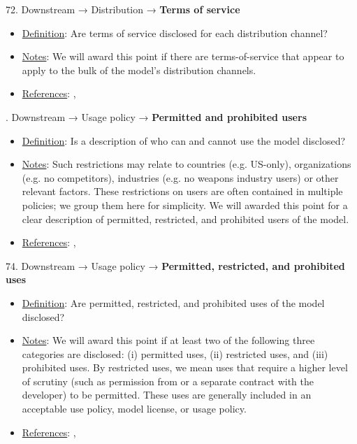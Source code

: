 72. Downstream → Distribution → \textbf{Terms of service}
\vspace{-\parskip}
\begin{itemize}
\item
\underline{Definition}: Are terms of service disclosed for each distribution channel?
\item
\underline{Notes}: We will award this point if there are terms-of-service that appear to apply to the bulk of the model’s distribution channels.
\item
\underline{References}: \citet{rakova2022termsweservewith}, \citet{liu2021identifying}
\end{itemize}


. Downstream → Usage policy → \textbf{Permitted and prohibited users}
\vspace{-\parskip}
\begin{itemize}
\item
\underline{Definition}: Is a description of who can and cannot use the model disclosed?
\item
\underline{Notes}: Such restrictions may relate to countries (e.g. US-only), organizations (e.g. no competitors), industries (e.g. no weapons industry users) or other relevant factors. These restrictions on users are often contained in multiple policies; we group them here for simplicity. We will awarded this point for a clear description of permitted, restricted, and prohibited users of the model.
\item
\underline{References}: \citet{cohere2022}, \citet{meta2023}
\end{itemize}


74. Downstream → Usage policy → \textbf{Permitted, restricted, and prohibited uses}
\vspace{-\parskip}
\begin{itemize}
\item
\underline{Definition}: Are permitted, restricted, and prohibited uses of the model disclosed?
\item
\underline{Notes}: We will award this point if at least two of the following three categories are disclosed: (i) permitted uses, (ii) restricted uses, and (iii) prohibited uses. By restricted uses, we mean uses that require a higher level of scrutiny (such as permission from or a separate contract with the developer) to be permitted. These uses are generally included in an acceptable use policy, model license, or usage policy.
\item
\underline{References}: \citet{cohere2022}, \citet{meta2023}
\end{itemize}


